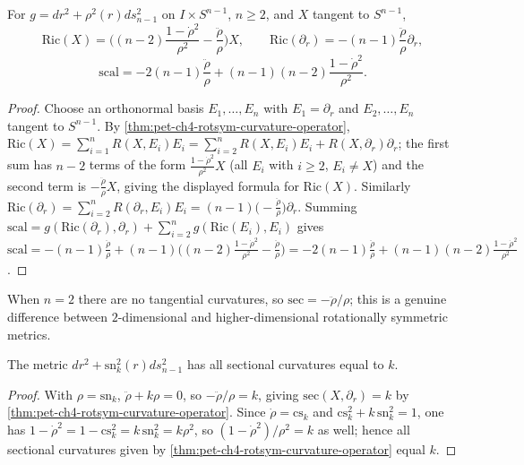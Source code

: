 \begin{proposition}
  \label{prop:pet-ch4-rotsym-ricci-scalar}
  For $g=dr^2+\rho^2(r)ds_{n-1}^2$ on $I\times S^{n-1}$, $n\ge2$, and $X$ tangent
  to $S^{n-1}$,
  \[
    \mathrm{Ric}(X)=\Big((n-2)\frac{1-\dot\rho^2}{\rho^2}-\frac{\ddot\rho}{\rho}\Big)X,
    \qquad
    \mathrm{Ric}(\partial_r)=-(n-1)\frac{\ddot\rho}{\rho}\partial_r,
  \]
  \[
    \mathrm{scal}=-2(n-1)\frac{\ddot\rho}{\rho}+(n-1)(n-2)\frac{1-\dot\rho^2}{\rho^2}.
  \]
\end{proposition}
\begin{proof}
  Choose an orthonormal basis $E_1,\dots,E_n$ with $E_1=\partial_r$ and
  $E_2,\dots,E_n$ tangent to $S^{n-1}$. By
  \cref{thm:pet-ch4-rotsym-curvature-operator},
  $\mathrm{Ric}(X)=\sum_{i=1}^nR(X,E_i)E_i=\sum_{i=2}^nR(X,E_i)E_i+R(X,\partial_r)\partial_r$;
  the first sum has $n-2$ terms of the form $\tfrac{1-\dot\rho^2}{\rho^2}X$ (all
  $E_i$ with $i\ge2$, $E_i\ne X$) and the second term is
  $-\tfrac{\ddot\rho}{\rho}X$, giving the displayed formula for $\mathrm{Ric}(X)$.
  Similarly $\mathrm{Ric}(\partial_r)=\sum_{i=2}^nR(\partial_r,E_i)E_i=(n-1)\big(-\tfrac{\ddot\rho}{\rho}\big)\partial_r$.
  Summing $\mathrm{scal}=g(\mathrm{Ric}(\partial_r),\partial_r)+\sum_{i=2}^ng(\mathrm{Ric}(E_i),E_i)$
  gives $\mathrm{scal}=-(n-1)\tfrac{\ddot\rho}{\rho}+(n-1)\big((n-2)\tfrac{1-\dot\rho^2}{\rho^2}-\tfrac{\ddot\rho}{\rho}\big)
  =-2(n-1)\tfrac{\ddot\rho}{\rho}+(n-1)(n-2)\tfrac{1-\dot\rho^2}{\rho^2}$.
\end{proof}

\begin{remark}
  \label{rem:pet-ch4-rotsym-dim2}
  When $n=2$ there are no tangential curvatures, so
  $\mathrm{sec}=-\ddot\rho/\rho$; this is a genuine difference between
  $2$-dimensional and higher-dimensional rotationally symmetric metrics.
\end{remark}

\begin{proposition}
  \label{prop:pet-ch4-snk-constant-curvature}
  The metric $dr^2+\mathrm{sn}_k^2(r)ds_{n-1}^2$ has all sectional curvatures
  equal to $k$.
\end{proposition}
\begin{proof}
  With $\rho=\mathrm{sn}_k$, $\ddot\rho+k\rho=0$, so $-\ddot\rho/\rho=k$, giving
  $\mathrm{sec}(X,\partial_r)=k$ by \cref{thm:pet-ch4-rotsym-curvature-operator}.
  Since $\dot\rho=\mathrm{cs}_k$ and $\mathrm{cs}_k^2+k\,\mathrm{sn}_k^2=1$, one has
  $1-\dot\rho^2=1-\mathrm{cs}_k^2=k\,\mathrm{sn}_k^2=k\rho^2$, so
  $(1-\dot\rho^2)/\rho^2=k$ as well; hence all sectional curvatures given by
  \cref{thm:pet-ch4-rotsym-curvature-operator} equal $k$.
\end{proof}

